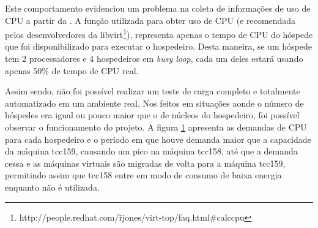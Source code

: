 Este comportamento evidenciou um problema na coleta de informações de uso de CPU
a partir da \libvirt{}. A função utilizada para obter uso de CPU (e recomendada
pelos desenvolvedores da
libvirt\footnote{http://people.redhat.com/\~rjones/virt-top/faq.html\#calccpu}),
representa apenas o tempo de CPU do hóspede que foi disponibilizado para
executar o hospedeiro. Desta maneira, se um hóspede tem 2 processadores e 4
hospedeiros em \emph{busy loop}, cada um deles estará usando apenas 50\% de
tempo de CPU real.

Assim sendo, não foi possível realizar um teste de carga completo e totalmente
automatizado em um ambiente real. Nos feitos em situações aonde o número de
hóspedes era igual ou pouco maior que o de núcleos do hospedeiro, foi possível
observar o funcionamento do projeto. A figura \ref{fig:cpuhost2} apresenta as
demandas de CPU para cada hospedeiro e o período em que houve demanda maior que
a capacidade da máquina tcc159, causando um pico na máquina tcc158, até que a
demanda cessa e as máquinas virtuais são migradas de volta para a máquina
tcc159, permitindo assim que tcc158 entre em modo de consumo de baixa energia
enquanto não é utilizada.

\begin{figure}[htp]
\centering
{}
\label{fig:cpuhost2}
\end{figure}


